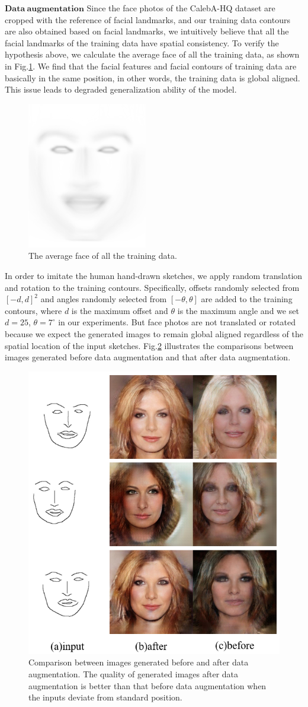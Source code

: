 \documentclass[10pt,twocolumn,letterpaper]{article}
\begin{document}
\noindent
$\mathbf{Data ~augmentation}$ Since the face photos of the CalebA-HQ dataset are cropped with the reference of facial landmarks, and our training data contours are also obtained based on facial landmarks, we intuitively believe that all the facial landmarks of the training data have spatial consistency. 
To verify the hypothesis above, we calculate the average face of all the training data, as shown in Fig.\ref{fig:average_face}. We find that the facial features and facial contours of training data are basically in the same position, in other words, the training data is global aligned. This issue leads to degraded generalization ability of the model. 
\begin{figure}[htb]
	\centering
	\includegraphics[width=0.2 \textwidth]{average_face.png}
	\caption{The average face of all the training data. }
	\label{fig:average_face}
\end{figure}
In order to imitate the human hand-drawn sketches, we apply random translation and rotation to the training contours. Specifically, offsets randomly selected from $[-d,d]^2$ and angles randomly selected from $[-\theta,\theta]$ are added to the training contours, where $d$ is the maximum offset and $\theta$ is the maximum angle and we set $d=25$, $\theta=7^\circ$ in our experiments. 
But face photos are not translated or rotated because we expect the generated images to remain global aligned regardless of the spatial location of the input sketches.
Fig.\ref{fig:data_augmentation} illustrates the comparisons between images generated before data augmentation and  that after data augmentation. 
\begin{figure}[htb]
	\centering
	\includegraphics[width=0.35 \textwidth]{data_augmentation.png}
	\caption{Comparison between images generated before and after data augmentation. The quality of generated images after data augmentation is better than that before data augmentation when the inputs deviate from standard position.}
	\label{fig:data_augmentation}
\end{figure}
\end{document}
